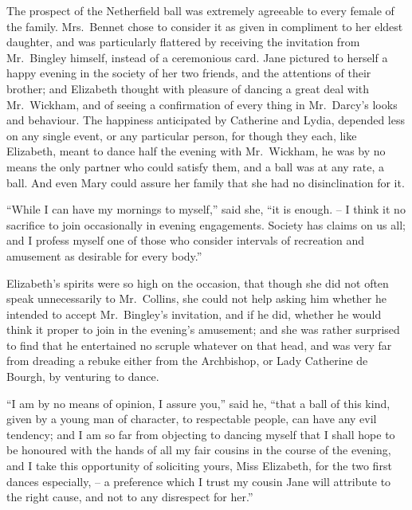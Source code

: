 The prospect of the Netherfield ball was extremely
agreeable to every female of the family. Mrs.\ Bennet
chose to consider it as given in compliment to her eldest
daughter, and was particularly flattered by receiving the
invitation from Mr.\ Bingley himself, instead of a ceremonious
card. Jane pictured to herself a happy evening
in the society of her two friends, and the attentions of their
brother; and Elizabeth thought with pleasure of dancing
a great deal with Mr.\ Wickham, and of seeing a confirmation
of every thing in Mr.\ Darcy’s looks and behaviour.
The happiness anticipated by Catherine and Lydia,
depended less on any single event, or any particular
person, for though they each, like Elizabeth, meant to
dance half the evening with Mr.\ Wickham, he was by no
means the only partner who could satisfy them, and a ball
was at any rate, a ball. And even Mary could assure her
family that she had no disinclination for it.

“While I can have my mornings to myself,” said she,
“it is enough. -- I think it no sacrifice to join occasionally
in evening engagements. Society has claims on us all;
and I profess myself one of those who consider intervals
of recreation and amusement as desirable for every body.”

Elizabeth’s spirits were so high on the occasion, that
though she did not often speak unnecessarily to Mr.\ Collins,
she could not help asking him whether he intended to
accept Mr.\ Bingley’s invitation, and if he did, whether
he would think it proper to join in the evening’s amusement;
and she was rather surprised to find that he entertained
no scruple whatever on that head, and was very
far from dreading a rebuke either from the Archbishop,
or Lady Catherine de Bourgh, by venturing to dance.

“I am by no means of opinion, I assure you,” said he,
“that a ball of this kind, given by a young man of character,
to respectable people, can have any evil tendency;
and I am so far from objecting to dancing myself that
I shall hope to be honoured with the hands of all my fair
cousins in the course of the evening, and I take this opportunity
of soliciting yours, Miss Elizabeth, for the two first
dances especially, -- a preference which I trust my cousin
Jane will attribute to the right cause, and not to any
disrespect for her.”

